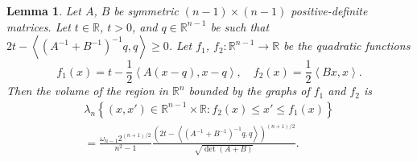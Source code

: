 \documentclass[a4paper]{amsart}
\newtheorem{lemma}[theorem]{Lemma}
\theoremstyle{definition}
\numberwithin{equation}{section}
\begin{document}
\begin{lemma}\label{lem_comport_asintot_covario}
Let $A$, $B$ be symmetric $(n-1) \times (n-1)$ positive-definite matrices. Let $t\in{\mathbb{R}}$, $t>0$, and  $q\in{\mathbb{R}}^{n-1}$ be such that $2t-\left<\left(A^{-1}+B^{-1}\right)^{-1}q, q\right>\geq0$.
Let $f_1$, $f_2:{\mathbb{R}}^{n-1}\to{\mathbb{R}}$  be the quadratic functions
\[
f_1(x)=t-\frac{1}{2}\left<A(x-q),x-q\right>,\quad f_2(x)=\frac{1}{2}\left<Bx,x\right>.
\]
 Then the volume  of the region in ${\mathbb{R}}^{n}$ bounded by the graphs of $f_1$ and $f_2$  is
\begin{multline*}
 {{\lambda}}_n\left\{(x,x')\in{\mathbb{R}}^{n-1}\times{\mathbb{R}} : f_2(x)\leq x'\leq f_1(x)\right\}\\
 =\frac{\omega_{n-1} 2^{(n+1)/2}}{n^2-1}
 \frac{ \left( 2t-\left<\left(A^{-1}+B^{-1}\right)^{-1}q, q\right>\right)^{(n+1)/2}}
{\sqrt{\det(A+B)}}.
\end{multline*}
\end{lemma}
\end{document}
